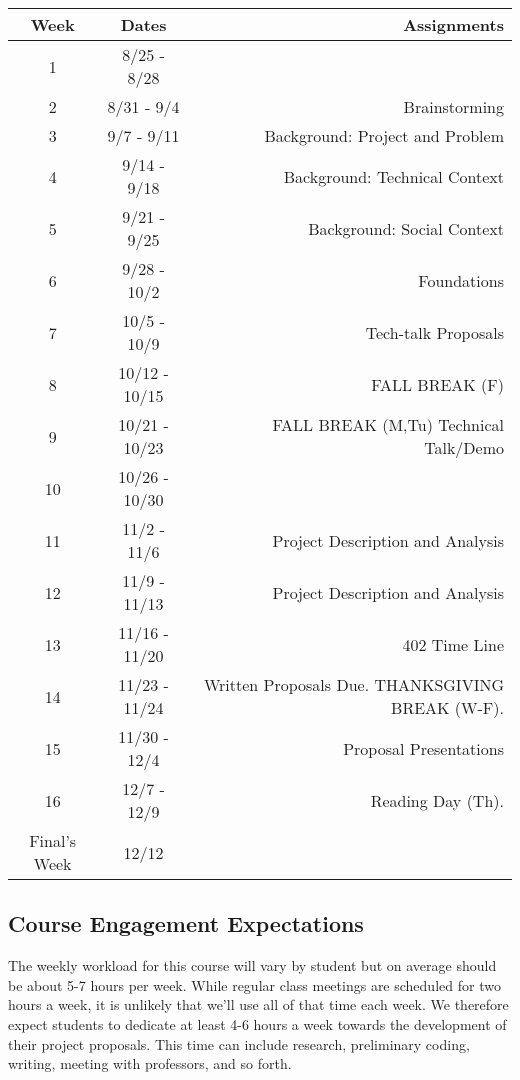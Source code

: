 \documentclass[10pt]{article}
\begin{document}
\begin{center}
\begin{tabular}{|c|c|r|}
\hline 
Week & Dates & Assignments \\
\hline
1 & 8/25 - 8/28 &   \\
\hline 
2 & 8/31 - 9/4 &   Brainstorming \\
\hline
3 & 9/7 - 9/11 &   Background: Project and Problem \\
\hline
4 & 9/14 - 9/18 &  Background: Technical Context \\
\hline
5 & 9/21 - 9/25 &  Background: Social Context \\
\hline
6 & 9/28 - 10/2 &  Foundations \\
\hline
7 & 10/5 - 10/9  & Tech-talk Proposals\\
\hline 
8 & 10/12 - 10/15 &  FALL BREAK (F) \\
\hline
9 & 10/21 - 10/23 & FALL BREAK (M,Tu) Technical Talk/Demo \\
\hline
10 & 10/26 - 10/30 &  \\
\hline
11 & 11/2 - 11/6 & Project Description and Analysis \\
\hline
12 & 11/9 - 11/13 & Project Description and Analysis \\
\hline
13 & 11/16 - 11/20 & 402 Time Line \\ 
\hline
14 & 11/23 - 11/24 &  Written Proposals Due. THANKSGIVING BREAK (W-F).   \\
\hline
15 & 11/30 - 12/4 & Proposal Presentations\\ 
\hline
16 & 12/7 - 12/9 &   Reading Day (Th). \\
\hline
Final's Week & 12/12  \\ 
\hline
\end{tabular}
\end{center}

\subsection{Course Engagement Expectations}

The weekly workload for this course will vary by student but on average should be about 5-7 hours per week.  While regular class meetings are scheduled for two hours a week, it is unlikely that we'll use all of that time each week.  We therefore expect students to dedicate at least 4-6 hours a week towards the development of their project proposals.  This time can include research, preliminary coding, writing, meeting with professors, and so forth.
\end{document}
